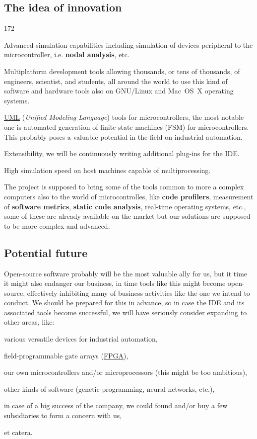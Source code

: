 \documentclass[a4paper,twoside,15pt]{book}
\begin{document}
		\subsection{The idea of innovation}
			\begin{dingautolist}{172}
				\item Advanced simulation capabilities including simulation of devices peripheral to the microcontroller, i.e. \textbf{nodal analysis}, etc.
				\item Multiplatform development tools allowing thousands, or tens of thousands, of engineers, scientist, and students, all around the world to use this kind of software and hardware tools also on GNU/Linux and Mac~OS~X operating systems.
				\item \href{http://en.wikipedia.org/wiki/Unified_Modeling_Language}{UML} (\textit{Unified Modeling Language}) tools for microcontrollers, the most notable one is automated generation of finite state machines (FSM) for microcontrollers. This probably poses a valuable potential in the field on industrial automation.
				\item Extensibility, we will be continuously writing additional plug-ins for the IDE.
				\item High simulation speed on host machines capable of multiprocessing.
				\item The project is supposed to bring some of the tools common to more a complex computers also to the world of microcontrolles, like \textbf{code profilers}, measurement of \textbf{software metrics}, \textbf{static code analysis}, real-time operating systems, etc., some of these are already available on the market but our solutions are supposed to be more complex and advanced.
			\end{dingautolist}

		\subsection{Potential future}
			Open-source software probably will be the most valuable ally for us, but it time it might also endanger our business, in time tools like this might become open-source, effectively inhibiting many of business activities like the one we intend to conduct. We should be prepared for this in advance, so in case the IDE and its associated tools become successful, we will have seriously consider expanding to other areas, like:
			\begin{dinglist}{73}
				\item various versatile devices for industrial automation,
				\item field-programmable gate arrays (\href{http://en.wikipedia.org/wiki/Programmable_gate_array}{FPGA}),
				\item our own microcontrollers and/or microprocessors (this might be too ambitious),
				\item other kinds of software (genetic programming, neural networks, etc.),
				\item in case of a big success of the company, we could found and/or buy a few subsidiaries to form a concern with us,
				\item et catera.
			\end{dinglist}
\end{document}
